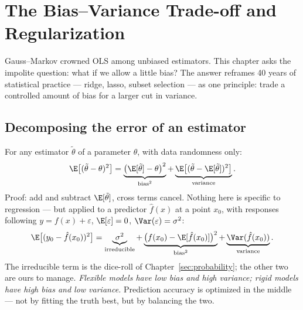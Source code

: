 \section{The Bias--Variance Trade-off and Regularization}\label{sec:bias-variance}

Gauss--Markov crowned OLS among unbiased estimators. This chapter asks the impolite question: what if we allow a little bias? The answer reframes 40 years of statistical practice — ridge, lasso, subset selection — as one principle: trade a controlled amount of bias for a larger cut in variance.

\subsection{Decomposing the error of an estimator}

For any estimator $\tilde{\theta}$ of a parameter $\theta$, with data randomness only:
\begin{equation}\label{eq:bv}
  \E\big[(\tilde{\theta} - \theta)^2\big]
  = \underbrace{\big(\E[\tilde{\theta}] - \theta\big)^2}_{\text{bias}^2}
  + \underbrace{\E\big[(\tilde{\theta} - \E[\tilde{\theta}])^2\big]}_{\text{variance}}.
\end{equation}
Proof: add and subtract $\E[\tilde\theta]$, cross terms cancel. Nothing here is specific to regression — but applied to a predictor $\hat{f}(x)$ at a point $x_0$, with responses following $y = f(x) + \varepsilon$, $\E[\varepsilon]=0$, $\Var(\varepsilon)=\sigma^2$:
\begin{equation}\label{eq:bv-pred}
  \E\big[(y_0 - \hat{f}(x_0))^2\big]
  = \underbrace{\sigma^2}_{\text{irreducible}}
  + \underbrace{\big(f(x_0) - \E[\hat{f}(x_0)]\big)^2}_{\text{bias}^2}
  + \underbrace{\Var(\hat{f}(x_0))}_{\text{variance}}.
\end{equation}
The irreducible term is the dice-roll of Chapter~\ref{sec:probability}; the other two are ours to manage. \emph{Flexible models have low bias and high variance; rigid models have high bias and low variance.} Prediction accuracy is optimized in the middle — not by fitting the truth best, but by balancing the two.

